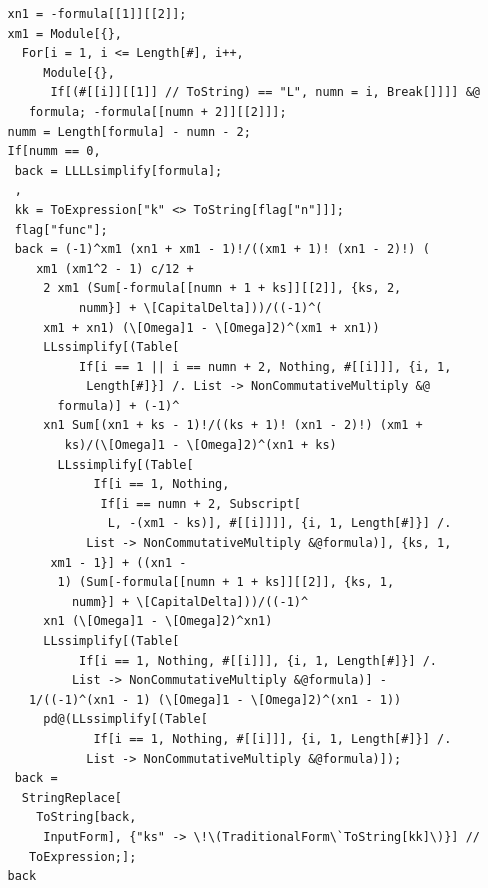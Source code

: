 \documentclass[12pt]{article}
\def\[#1\]{\begin{align}#1\end{align}}
\begin{document}
\begin{verbatim}
   xn1 = -formula[[1]][[2]];
   xm1 = Module[{}, 
     For[i = 1, i <= Length[#], i++, 
        Module[{}, 
         If[(#[[i]][[1]] // ToString) == "L", numn = i, Break[]]]] &@
      formula; -formula[[numn + 2]][[2]]];
   numm = Length[formula] - numn - 2;
   If[numm == 0,
    back = LLLLsimplify[formula];
    ,
    kk = ToExpression["k" <> ToString[flag["n"]]];
    flag["func"];
    back = (-1)^xm1 (xn1 + xm1 - 1)!/((xm1 + 1)! (xn1 - 2)!) (
       xm1 (xm1^2 - 1) c/12 + 
        2 xm1 (Sum[-formula[[numn + 1 + ks]][[2]], {ks, 2, 
             numm}] + \[CapitalDelta]))/((-1)^(
        xm1 + xn1) (\[Omega]1 - \[Omega]2)^(xm1 + xn1))
        LLssimplify[(Table[
             If[i == 1 || i == numn + 2, Nothing, #[[i]]], {i, 1, 
              Length[#]}] /. List -> NonCommutativeMultiply &@
          formula)] + (-1)^
        xn1 Sum[(xn1 + ks - 1)!/((ks + 1)! (xn1 - 2)!) (xm1 + 
           ks)/(\[Omega]1 - \[Omega]2)^(xn1 + ks)
          LLssimplify[(Table[
               If[i == 1, Nothing, 
                If[i == numn + 2, Subscript[
                 L, -(xm1 - ks)], #[[i]]]], {i, 1, Length[#]}] /. 
              List -> NonCommutativeMultiply &@formula)], {ks, 1, 
         xm1 - 1}] + ((xn1 - 
          1) (Sum[-formula[[numn + 1 + ks]][[2]], {ks, 1, 
            numm}] + \[CapitalDelta]))/((-1)^
        xn1 (\[Omega]1 - \[Omega]2)^xn1)
        LLssimplify[(Table[
             If[i == 1, Nothing, #[[i]]], {i, 1, Length[#]}] /. 
            List -> NonCommutativeMultiply &@formula)] - 
      1/((-1)^(xn1 - 1) (\[Omega]1 - \[Omega]2)^(xn1 - 1))
        pd@(LLssimplify[(Table[
               If[i == 1, Nothing, #[[i]]], {i, 1, Length[#]}] /. 
              List -> NonCommutativeMultiply &@formula)]);
    back = 
     StringReplace[
       ToString[back, 
        InputForm], {"ks" -> \!\(TraditionalForm\`ToString[kk]\)}] // 
      ToExpression;];
   back
   

\end{verbatim}
\end{document}

